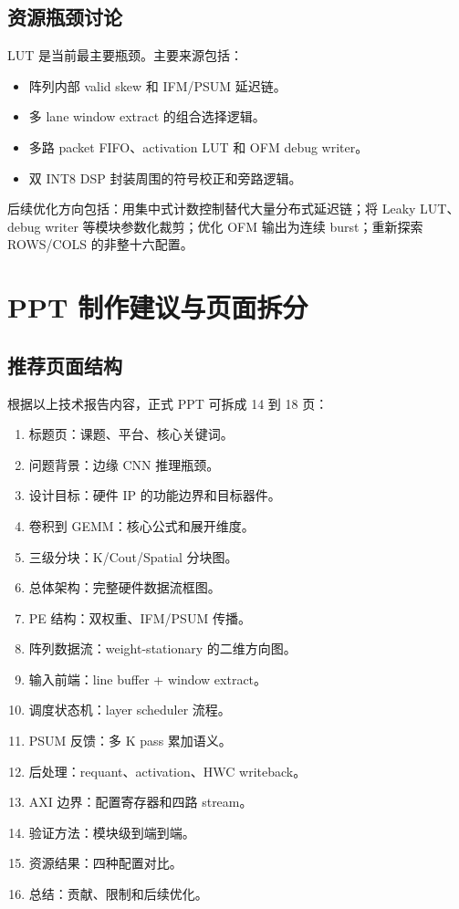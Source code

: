 \documentclass[fontset=fandol,ugly,language=chinese]{pkuthss}
\begin{document}
\section{资源瓶颈讨论}

LUT 是当前最主要瓶颈。主要来源包括：

\begin{itemize}
    \item 阵列内部 valid skew 和 IFM/PSUM 延迟链。
    \item 多 lane window extract 的组合选择逻辑。
    \item 多路 packet FIFO、activation LUT 和 OFM debug writer。
    \item 双 INT8 DSP 封装周围的符号校正和旁路逻辑。
\end{itemize}

后续优化方向包括：用集中式计数控制替代大量分布式延迟链；将 Leaky LUT、debug writer 等模块参数化裁剪；优化 OFM 输出为连续 burst；重新探索 ROWS/COLS 的非整十六配置。

\chapter{PPT 制作建议与页面拆分}

\section{推荐页面结构}

根据以上技术报告内容，正式 PPT 可拆成 14 到 18 页：

\begin{enumerate}
    \item 标题页：课题、平台、核心关键词。
    \item 问题背景：边缘 CNN 推理瓶颈。
    \item 设计目标：硬件 IP 的功能边界和目标器件。
    \item 卷积到 GEMM：核心公式和展开维度。
    \item 三级分块：K/Cout/Spatial 分块图。
    \item 总体架构：完整硬件数据流框图。
    \item PE 结构：双权重、IFM/PSUM 传播。
    \item 阵列数据流：weight-stationary 的二维方向图。
    \item 输入前端：line buffer + window extract。
    \item 调度状态机：layer scheduler 流程。
    \item PSUM 反馈：多 K pass 累加语义。
    \item 后处理：requant、activation、HWC writeback。
    \item AXI 边界：配置寄存器和四路 stream。
    \item 验证方法：模块级到端到端。
    \item 资源结果：四种配置对比。
    \item 总结：贡献、限制和后续优化。
\end{enumerate}
\end{document}
